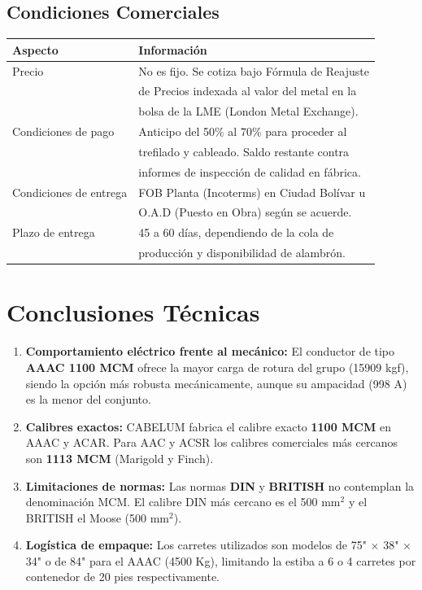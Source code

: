 \documentclass[12pt,a4paper]{article}
\begin{document}
\subsection{Condiciones Comerciales}

\begin{center}
\begin{tabular}{ll}
\toprule
\textbf{Aspecto} & \textbf{Información} \\
\midrule
Precio & No es fijo. Se cotiza bajo Fórmula de Reajuste \\
& de Precios indexada al valor del metal en la \\
& bolsa de la LME (London Metal Exchange). \\
\midrule
Condiciones de pago & Anticipo del 50\% al 70\% para proceder al \\
& trefilado y cableado. Saldo restante contra \\
& informes de inspección de calidad en fábrica. \\
\midrule
Condiciones de entrega & FOB Planta (Incoterms) en Ciudad Bolívar u \\
& O.A.D (Puesto en Obra) según se acuerde. \\
\midrule
Plazo de entrega & 45 a 60 días, dependiendo de la cola de \\
& producción y disponibilidad de alambrón. \\
\bottomrule
\end{tabular}
\end{center}

\section{Conclusiones Técnicas}

\begin{enumerate}
    \item \textbf{Comportamiento eléctrico frente al mecánico:} El conductor de
        tipo \textbf{AAAC 1100 MCM} ofrece la mayor carga de rotura del grupo
        (15909 kgf), siendo la opción más robusta mecánicamente, aunque su
        ampacidad (998 A) es la menor del conjunto.

    \item \textbf{Calibres exactos:} CABELUM fabrica el calibre exacto
        \textbf{1100 MCM} en AAAC y ACAR. Para AAC y ACSR los calibres
        comerciales más cercanos son \textbf{1113 MCM} (Marigold y Finch).

    \item \textbf{Limitaciones de normas:} Las normas \textbf{DIN} y
        \textbf{BRITISH} no contemplan la denominación MCM. El calibre DIN
        más cercano es el 500 mm$^2$ y el BRITISH el Moose (500 mm$^2$).

    \item \textbf{Logística de empaque:} Los carretes utilizados son modelos
        de 75" × 38" × 34" o de 84" para el AAAC (4500 Kg), limitando la
        estiba a 6 o 4 carretes por contenedor de 20 pies respectivamente.
\end{enumerate}
\end{document}
